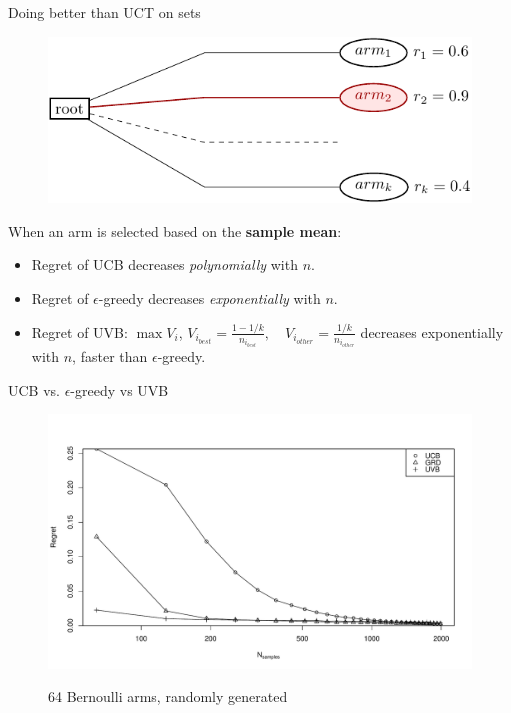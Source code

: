 \documentclass{beamer}
\begin{document}
\begin{frame}{Doing better than UCT on sets}
\begin{figure}[h]
\centering
\includegraphics[scale=0.8]{onelevel-tree.pdf}
\end{figure}
When an arm is selected based on the {\bf sample mean}:
\begin{itemize}
\item Regret of UCB decreases {\it polynomially} with $n$.
\item Regret of $\epsilon$-greedy decreases {\it exponentially} with
  $n$.
\item Regret of UVB: $\max V_i$, $V_{i_{best}}=\frac {1-1/k}
  {n_{i_{best}}},\quad V_{i_{other}}=\frac {1/k} {n_{i_{other}}}$
  decreases exponentially with $n$, faster than $\epsilon$-greedy.
\end{itemize}
\end{frame}

\begin{frame}{UCB vs. $\epsilon$-greedy vs UVB}
\begin{figure}[h]
\centering
\includegraphics[scale=0.45]{onelevel-64.pdf}

64 Bernoulli arms, randomly generated
\end{figure}
\end{frame}
\end{document}
